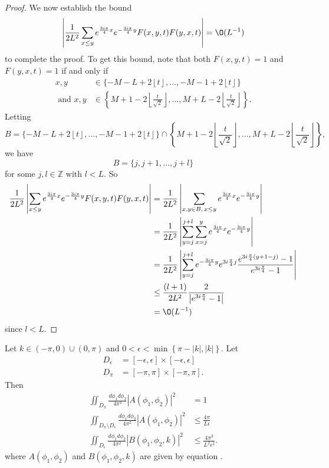 \documentclass[../thesis-main/thesis-main]{subfiles}
\begin{document}
\begin{proof}
We now establish the bound
\[
\left|\frac{1}{2L^{2}}\sum_{x\leq y}e^{\frac{3i\pi}{4}x}e^{-\frac{3i\pi}{4}y}F(x,y,t) F(y,x,t) \right|=\O(L^{-1})
\]
to complete the proof.  To get this bound, note that both $F(x,y,t) =1$ and $F(y,x,t) =1$
if and only if
\begin{align*}
x,y & \in \{-M-L+2\left\lfloor t\right\rfloor ,\ldots,-M-1+2\left\lfloor t\right\rfloor \}\\
\text{ and }x,y & \in \left\{M+1-2\left\lfloor \frac{t}{\sqrt{2}}\right\rfloor ,\ldots,M+L-2\left\lfloor \frac{t}{\sqrt{2}}\right\rfloor \right\}.
\end{align*}
Letting
\[
B=\{-M-L+2\left\lfloor t\right\rfloor ,\ldots,-M-1+2\left\lfloor t\right\rfloor \} \cap \left\{M+1-2\left\lfloor \frac{t}{\sqrt{2}}\right\rfloor ,\ldots,M+L-2\left\lfloor \frac{t}{\sqrt{2}}\right\rfloor \right\},
\]
we have
 \[
B=\{j,j+1,\ldots,j+l\}
\]
for some $j,l\in\mathbb{Z}$ with $l<L$. So
\begin{align*}
\frac{1}{2L^{2}}\left|\sum_{x\leq y}e^{\frac{3i\pi}{4}x}e^{-\frac{3i\pi}{4}y}F(x,y,t) F(y,x,t) \right| & = \frac{1}{2L^{2}}\left|\sum_{x,y\in B,\, x\leq y}e^{\frac{3i\pi}{4}x}e^{-\frac{3i\pi}{4}y}\right|\\
 &  = \frac{1}{2L^{2}}\left|\sum_{y=j}^{j+l}\sum_{x=j}^{y}e^{\frac{3i\pi}{4}x}e^{-\frac{3i\pi}{4}y}\right|\\
 &= \frac{1}{2L^{2}}\left|\sum_{y=j}^{j+l}e^{-\frac{3i\pi}{4}y}e^{3i\frac{\pi}{4}j}\frac{e^{3i\frac{\pi}{4}\left(y+1-j\right)}-1}{e^{3i\frac{\pi}{4}}-1}\right|\\
 & \leq \frac{(l+1)}{2L^{2}}\frac{2}{\left|e^{3i\frac{\pi}{4}}-1\right|}\\
 &= \O(L^{-1})
 \end{align*}
since $l<L$.
\end{proof}
\begin{lemma}
\label{lem:Let--and}Let $k\in(-\pi,0)\cup(0,\pi)$ and $0<\epsilon<\min\left\{ \pi-|k|,|k|\right\}$.
Let
\begin{align*}
D_{\epsilon} & =  \left[-\epsilon,\epsilon\right]\times\left[-\epsilon,\epsilon\right]\\
D_{\pi} & =  \left[-\pi,\pi\right]\times\left[-\pi,\pi\right].
\end{align*}
Then 
\begin{align*}
\iint_{D_{\pi}}\frac{d\phi_{1}d\phi_{2}}{4\pi^{2}}|A(\phi_{1},\phi_{2})|^{2} & =  1\\
\iint_{D_{\pi}\setminus D_{\epsilon}}\frac{d\phi_{1}d\phi_{2}}{4\pi^{2}}|A(\phi_{1},\phi_{2})|^{2} & \leq  \frac{4\pi}{L\epsilon}\\
\iint_{D_{\epsilon}}\frac{d\phi_{1}d\phi_{2}}{4\pi^{2}}|B(\phi_{1},\phi_{2},k)|^{2} & \leq  \frac{4\pi^{2}}{L^{2}\epsilon^{2}}.\end{align*}
where $A(\phi_1,\phi_2)$ and $B(\phi_1,\phi_2,k)$ are given by equation .
 \end{lemma}
\end{document}

